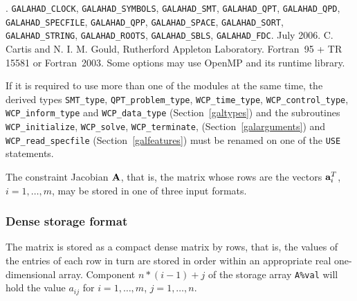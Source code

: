 \documentclass{galahad}
\newcommand{\packagename}{WCP}
\newcommand{\fullpackagename}{\libraryname\_\-\packagename}
\begin{document}

\galattributes
\galversions{\tt  \fullpackagename\_single, \fullpackagename\_double}.
\galuses 
{\tt GALAHAD\_\-CLOCK},
{\tt GALAHAD\_SY\-M\-BOLS}, 
{\tt GALAHAD\_SMT},
{\tt GALAHAD\_QPT}, {\tt GALAHAD\_QPD}, {\tt GALAHAD\_SPECFILE}, 
{\tt GALAHAD\_QPP}, {\tt GALAHAD\_SPACE}, {\tt GALAHAD\_\-SORT}, 
{\tt GALAHAD\_STRING}, {\tt GALAHAD\_\-ROOTS}, {\tt GALAHAD\_\-SBLS},
{\tt GALAHAD\_FDC}.
\galdate July 2006.
\galorigin C. Cartis and N. I. M. Gould, Rutherford Appleton Laboratory.
\gallanguage Fortran~95 + TR 15581 or Fortran~2003. 
\galparallelism Some options may use OpenMP and its runtime library.


\galhowto




\noindent
If it is required to use more than one of the modules at the same time, 
the derived types
{\tt SMT\_type}, 
{\tt QPT\_problem\_type}, 
{\tt \packagename\_time\_type}, 
{\tt \packagename\_control\_type}, 
{\tt \packagename\_inform\_type} 
and
{\tt \packagename\_data\_type}
(Section~\ref{galtypes})
and the subroutines
{\tt \packagename\_initialize}, 
{\tt \packagename\_\-solve},
{\tt \packagename\_terminate},
(Section~\ref{galarguments})
and 
{\tt \packagename\_read\_specfile}
(Section~\ref{galfeatures})
must be renamed on one of the {\tt USE} statements.


\galmatrix
The constraint Jacobian ${\mathbf{A}}$, that is, the matrix 
whose rows are the vectors ${\mathbf{a}}_{i}^{T}$, $i = 1, \ldots , m$, 
may be stored in one of three input formats.

\subsubsection{Dense storage format}\label{dense}
The matrix is stored as a compact 
dense matrix by rows, that is, the values of the entries of each row in turn are
stored in order within an appropriate real one-dimensional array.
Component $n \ast (i-1) + j$ of the storage array {\tt A\%val} will hold the 
value $a_{ij}$ for $i = 1, \ldots , m$, $j = 1, \ldots , n$.
\end{document}
